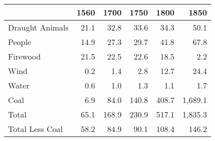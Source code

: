 \begin{tabular}{lrrrrr}
	\hline \hline 
	& 1560 & 1700 & 1750 & 1800 & 1850  \\
	\hline
    Draught Animals & 21.1 & 32.8 & 33.6 & 34.3 & 50.1 \\
    People          & 14.9 & 27.3 & 29.7 & 41.8 & 67.8 \\
    Firewood        & 21.5 & 22.5 & 22.6 & 18.5 &  2.2 \\
    Wind            &  0.2 &  1.4 &  2.8 & 12.7 & 24.4 \\
    Water           &  0.6 &  1.0 &  1.3 &  1.1 &  1.7 \\
    Coal            &  6.9 & 84.0 & 140.8 & 408.7 & 1,689.1 \\[2ex]
    Total           & 65.1 & 168.9 & 230.9 & 517.1 & 1,835.3 \\
    Total Less Coal & 58.2 & 84.9 & 90.1 & 108.4 & 146.2 \\
	\hline
\end{tabular}
